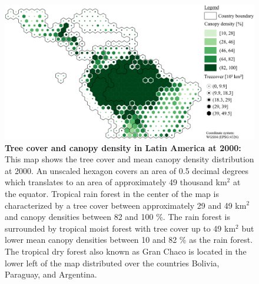 			\begin{figure}[ht]
				\centering
				\includegraphics[scale=.9]{img/americas_treecover_frameless}
				\caption[Tree cover and canopy density in Latin America at 2000]{\textbf{Tree cover and canopy density in Latin America at 2000:} This map shows the tree cover and mean canopy density distribution at 2000. An unscaled hexagon covers an area of 0.5 decimal degrees which translates to an area of approximately 49 thousand km$^2$ at the equator. Tropical rain forest in the center of the map is characterized by a tree cover between approximately 29 and 49 km$^2$ and canopy densities between 82 and 100 \%. The rain forest is surrounded by tropical moist forest with tree cover up to 49 km$^2$ but lower mean canopy densities between 10 and 82 \% as the rain forest. The tropical dry forest also known as Gran Chaco is located in the lower left of the map distributed over the countries Bolivia, Paraguay, and Argentina.}
				\label{fig:americas_tree_cover}
			\end{figure}

